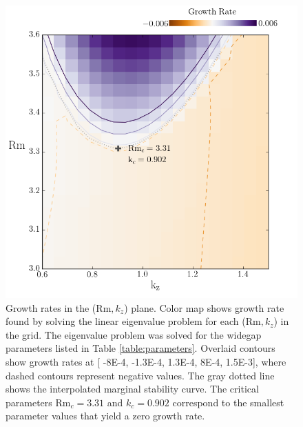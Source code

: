 \documentclass{emulateapj}
\newcommand\reym{\mathrm{Rm}}
\begin{document}
\begin{figure}
\centering
\includegraphics[width=\columnwidth]{../figures/widegap_paramspace_crit_params_Pm_16E-7}
\caption{Growth rates in the ($\reym, k_z$) plane. Color map shows growth rate found by solving the linear eigenvalue problem for each ($\reym, k_z$) in the grid. The eigenvalue problem was solved for the widegap parameters listed in Table \ref{table:parameters}. Overlaid contours show growth rates at [ -8E-4, -1.3E-4, 1.3E-4, 8E-4, 1.5E-3], where dashed contours represent negative values. The gray dotted line shows the interpolated marginal stability curve. The critical parameters $\reym_c = 3.31$ and $k_c = 0.902$ correspond to the smallest parameter values that yield a zero growth rate.}\label{fig:growth_rates}
\end{figure}
\end{document}
